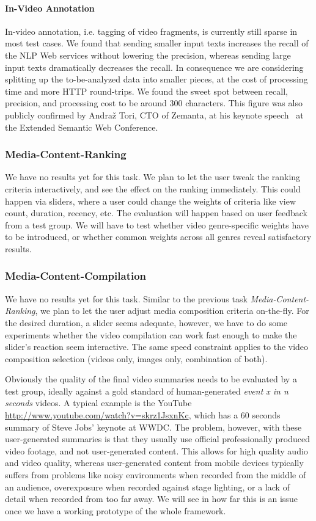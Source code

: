 \documentclass[runningheads,a4paper]{llncs}
\begin{document}
\paragraph{In-Video Annotation}
In-video annotation, i.e. tagging of video fragments, is currently still sparse in most test cases. We found that sending smaller input texts increases the recall of the NLP Web services without lowering the precision, whereas sending large input texts dramatically decreases the recall. In consequence we are considering splitting up the to-be-analyzed data into smaller pieces, at the cost of processing time and more HTTP round-trips. We found the sweet spot between recall, precision, and processing cost to be around 300 characters. This figure was also publicly confirmed by Andra\v{z} Tori, CTO of Zemanta, at his keynote speech~\cite{andraz} at the Extended Semantic Web Conference.

\subsubsection{Media-Content-Ranking}
We have no results yet for this task. We plan to let the user tweak the ranking criteria interactively, and see the effect on the ranking immediately. This could happen via sliders, where a user could change the weights of criteria like view count, duration, recency, etc. The evaluation will happen based on user feedback from a test group. We will have to test whether video genre-specific weights have to be introduced, or whether common weights across all genres reveal satisfactory results.

\subsubsection{Media-Content-Compilation}
We have no results yet for this task. Similar to the previous task \emph{Media-Content-Ranking}, we plan to let the user adjust media composition criteria on-the-fly. For the desired duration, a slider seems adequate, however, we have to do some experiments whether the video compilation can work fast enough to make the slider's reaction seem interactive. The same speed constraint applies to the video composition selection (videos only, images only, combination of both).

Obviously the quality of the final video summaries needs to be evaluated by a test group, ideally against a gold standard of human-generated \emph{event x in n seconds} videos. A typical example is the YouTube \url{http://www.youtube.com/watch?v=skrz1JsxnKc}, which has a 60 seconds summary of Steve Jobs' keynote at WWDC. The problem, however, with these user-generated summaries is that they usually use official professionally produced video footage, and not user-generated content. This allows for high quality audio and video quality, whereas user-generated content from mobile devices typically suffers from problems like noisy environments when recorded from the middle of an audience, overexposure when recorded against stage lighting, or a lack of detail when recorded from too far away. We will see in how far this is an issue once we have a working prototype of the whole framework.
\end{document}
